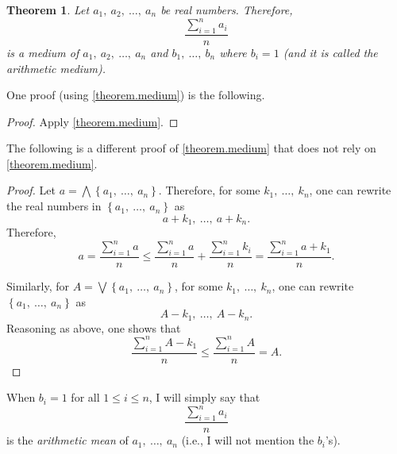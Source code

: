 \documentclass[11pt,oneside]{book}
\newtheorem{theorem}{Theorem}[chapter]
\theoremstyle{definition}
\theoremstyle{remark}
\begin{document}
\begin{theorem}
    Let $a_1,\ a_2,\ \dots,\ a_n$ be real numbers. Therefore, 
    \[
        \frac{\sum_{i=1}^{n}a_i}{n}
    \]
    is a medium of $a_1,\ a_2,\ \dots,\ a_n$ and $b_1,\ \dots,\ b_n$ where $b_i = 1$ (and it is called the \textit{arithmetic medium}).
\end{theorem}
One proof (using \cref{theorem.medium}) is the following.
\begin{proof}
    Apply \cref{theorem.medium}.
\end{proof}

The following is a different proof of \cref{theorem.medium} that does not rely on \cref{theorem.medium}.
\begin{proof}
    Let $a = \bigwedge\left\{a_1,\ \dots,\ a_n\right\}$.
Therefore, for some $k_1,\ \dots,\ k_n$, one can rewrite the real numbers in $\left\{a_1,\ \dots,\ a_n\right\}$ as 
\[
    a+k_1,\ \dots,\ a+k_n.
\]
Therefore, 
\[
    a = \frac{\sum_{i=1}^{n} a}{n} \leq \frac{\sum_{i=1}^{n} a}{n} + \frac{\sum_{i=1}^{n} k_i}{n} = \frac{\sum_{i=1}^{n} a+k_1}{n}.
\]

Similarly, for $A = \bigvee \left\{a_1,\ \dots,\ a_n\right\}$, for some $k_1,\ \dots,\ k_n$, one can rewrite $\left\{a_1,\ \dots,\ a_n\right\}$ as 
\[
    A-k_1,\ \dots,\ A-k_n.
\]
Reasoning as above, one shows that 
\[
    \frac{\sum_{i=1}^{n} A-k_1}{n} \leq \frac{\sum_{i=1}^{n} A}{n} = A.
\]
\end{proof}
When $b_i = 1$ for all $1\leq i \leq n$, I will simply say that 
\[
    \frac{\sum_{i=1}^{n} a_i}{n}
\] 
is the \textit{arithmetic mean} of $a_1,\ \dots,\ a_n$ (i.e., I will not mention the $b_i$'s).



% 
% 
\end{document}
